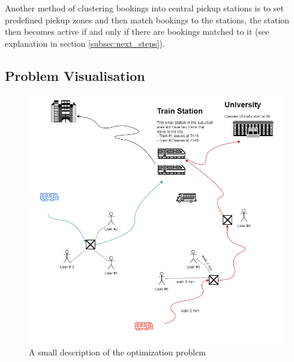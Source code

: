 \documentclass{article}
\begin{document}
Another method of clustering bookings into central pickup stations is to set predefined pickup zones and then match bookings to the stations, the station then becomes active if and only if there are bookings matched to it (see explanation in section \ref{subsec:next_steps}).


\subsection{Problem Visualisation}
\label{subsec:problem_vis}

\begin{figure}[H]
\centering
\includegraphics[scale=0.4]{pictures/Display_problem}
\caption{A small description of the optimization problem}
\label{fig:Diagram}
\end{figure}
\end{document}

